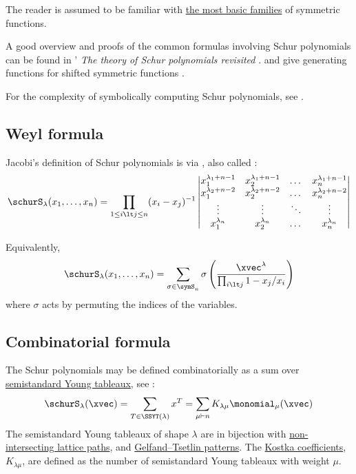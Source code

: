 The reader is assumed to be familiar
with \hyperref[symmetricFunctions]{the most basic families} of symmetric functions.

A good overview and proofs of the common formulas involving Schur polynomials
can be found in ' \emph{The theory of Schur polynomials
revisited} \cite{Tamvakis2012}.
 and  give generating functions
for shifted symmetric functions \cite{JingRozhkovskaya2019}.


For the complexity of symbolically computing Schur polynomials, see
\cite{ChauguleKumarLimayeMohapatraSheSrinivasan2023}.


\subsection[schurWeylformula]{Weyl formula}

Jacobi's definition of Schur polynomials is via
\label{cauchyBialternantFormula},
also called \label{weylFormula}:
\begin{equation*}
 \schurS_\lambda(x_1,\dotsc,x_n) =  \prod_{1\leq i \lt j \leq n} (x_i-x_j)^{-1}
\begin{vmatrix}
x_1^{\lambda_1+n-1} & x_2^{\lambda_1+n-1} & \dotsc & x_n^{\lambda_1+n-1} \\
x_1^{\lambda_2+n-2} & x_2^{\lambda_2+n-2} & \dotsc & x_n^{\lambda_2+n-2} \\
\vdots & \vdots & \ddots & \vdots \\
x_1^{\lambda_n} & x_2^{\lambda_n} & \dotsc & x_n^{\lambda_n}
\end{vmatrix}
\end{equation*}

Equivalently,
\begin{equation*}
\schurS_\lambda(x_1,\dotsc,x_n) = \sum_{\sigma \in \symS_n} \sigma\left(\frac{\xvec^\lambda}{\prod_{i \lt j} 1-x_j/x_i }  \right)
\end{equation*}
where $\sigma$ acts by permuting the indices of the variables.


\subsection[schurCombinatorialFormula]{Combinatorial formula}

The Schur polynomials may be defined combinatorially as a sum over
\hyperref[prelimTableaux]{semistandard Young tableaux},
see \cite{Macdonald1995,StanleyEC2}:
\begin{equation*}
 \schurS_\lambda(\xvec) = \sum_{T \in \SSYT(\lambda)} x^{T} = \sum_{\mu \vdash n} K_{\lambda\mu}\monomial_\mu(\xvec)
\end{equation*}
The semistandard Young tableaux of shape $\lambda$ are
in bijection with \hyperref[LGVssyt]{non-intersecting lattice paths},
and \hyperref[gtpatternsAsSSYT]{Gelfand--Tsetlin patterns}.
The \hyperref[kostkaCoefficients]{Kostka coefficients}, $K_{\lambda\mu}$,
are defined as the number of semistandard Young tableaux with weight $\mu$.

